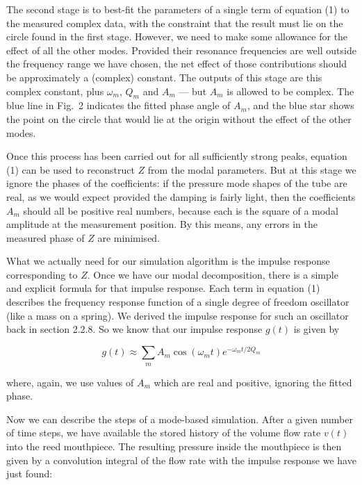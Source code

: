   The second stage is to best-fit the parameters of a single term of equation 
  (1) to the measured complex data, with the constraint that the result must 
  lie on the circle found in the first stage. However, we need to make some 
  allowance for the effect of all the other modes. Provided their resonance 
  frequencies are well outside the frequency range we have chosen, the net 
  effect of those contributions should be approximately a (complex) constant. 
  The outputs of this stage are this complex constant, plus $\omega_m$, $Q_m$ 
  and $A_m$ — but $A_m$ is allowed to be complex. The blue line in Fig.\ 2 
  indicates the fitted phase angle of $A_m$, and the blue star shows the point 
  on the circle that would lie at the origin without the effect of the other 
  modes. 

  Once this process has been carried out for all sufficiently strong peaks, 
  equation (1) can be used to reconstruct $Z$ from the modal parameters. But at 
  this stage we ignore the phases of the coefficients: if the pressure mode 
  shapes of the tube are real, as we would expect provided the damping is 
  fairly light, then the coefficients $A_m$ should all be positive real 
  numbers, because each is the square of a modal amplitude at the measurement 
  position. By this means, any errors in the measured phase of $Z$ are 
  minimised. 

  What we actually need for our simulation algorithm is the impulse response 
  corresponding to $Z$. Once we have our modal decomposition, there is a simple 
  and explicit formula for that impulse response. Each term in equation (1) 
  describes the frequency response function of a single degree of freedom 
  oscillator (like a mass on a spring). We derived the impulse response for 
  such an oscillator back in section 2.2.8. So we know that our impulse 
  response $g(t)$ is given by 

  $$g(t) \approx \sum_m{A_m \cos(\omega_m t) e^{-\omega_m t/2Q_m}} \tag{2}$$ 

  where, again, we use values of $A_m$ which are real and positive, ignoring 
  the fitted phase. 

  Now we can describe the steps of a mode-based simulation. After a given 
  number of time steps, we have available the stored history of the volume flow 
  rate $v(t)$ into the reed mouthpiece. The resulting pressure inside the 
  mouthpiece is then given by a convolution integral of the flow rate with the 
  impulse response we have just found: 

